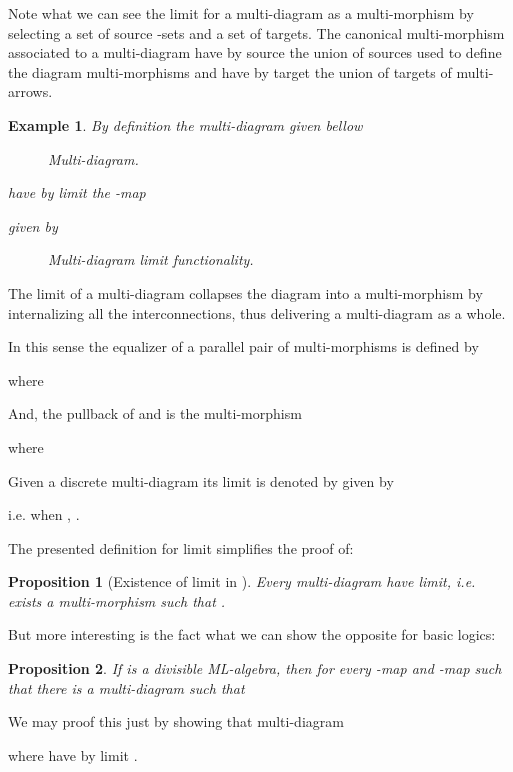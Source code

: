 \documentclass[oribibl]{llncs}
\newtheorem{prop}{Proposition}
\newtheorem{exam}{Example}
\begin{document}
Note what we can see the limit for a multi-diagram   as a multi-morphism by selecting a set of source -sets and a set of targets. The canonical multi-morphism associated to a multi-diagram  have by source  the union of sources used to define the diagram multi-morphisms and have by target  the union of targets of  multi-arrows.

\begin{exam}
By definition the multi-diagram  given bellow
\begin{figure}[h]

\caption{Multi-diagram.}\label{multidiagram1}
\end{figure}
have by limit the -map

given by

\begin{figure}[h]

\caption{Multi-diagram limit functionality.}\label{multidiagram2}
\end{figure}
\end{exam}
The limit of a multi-diagram collapses the diagram into a multi-morphism by internalizing all the interconnections, thus delivering a multi-diagram as a whole.

In this sense the equalizer of a parallel pair of multi-morphisms  is defined by

where


And, the pullback of  and  is the multi-morphism

where


Given a discrete multi-diagram   its limit is denoted by  given by

i.e. when , .

The presented definition for limit simplifies the proof of:

\begin{prop}[Existence of limit in ]
Every multi-diagram  have limit, i.e. exists a multi-morphism  such that .
\end{prop}

But more interesting is the fact what we can show the opposite for basic logics:

\begin{prop}
If  is a divisible ML-algebra, then for every -map  and -map  such that  there is a multi-diagram  such that 
\end{prop}

We may proof this just by showing that multi-diagram

where 
have by limit .
\end{document}
